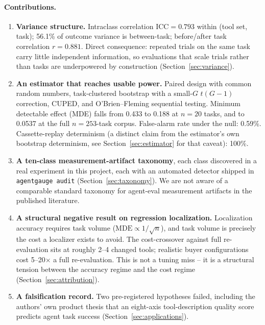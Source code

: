 \documentclass[11pt]{article}
\begin{document}
\paragraph{Contributions.}
\begin{enumerate}
\item \textbf{Variance structure.} Intraclass correlation $\mathrm{ICC}=0.793$ within (tool set,
  task); 56.1\% of outcome variance is between-task; before/after task correlation $r=0.881$.
  Direct consequence: repeated trials on the same task carry little independent information, so
  evaluations that scale trials rather than tasks are underpowered by construction
  (Section~\ref{sec:variance}).
\item \textbf{An estimator that reaches usable power.} Paired design with common random numbers,
  task-clustered bootstrap with a small-$G$ $t(G-1)$ correction, CUPED, and O'Brien--Fleming
  sequential testing. Minimum detectable effect (MDE) falls from 0.433 to 0.188 at $n=20$ tasks,
  and to 0.0537 at the full $n=253$-task corpus. False-alarm rate under the null: 0.59\%.
  Cassette-replay determinism (a distinct claim from the estimator's own bootstrap determinism,
  see Section~\ref{sec:estimator} for that caveat): 100\%.
\item \textbf{A ten-class measurement-artifact taxonomy}, each class discovered in a real
  experiment in this project, each with an automated detector shipped in \texttt{agentgauge audit}
  (Section~\ref{sec:taxonomy}). We are not aware of a comparable standard taxonomy for agent-eval
  measurement artifacts in the published literature.
\item \textbf{A structural negative result on regression localization.} Localization accuracy
  requires task volume ($\mathrm{MDE}\propto 1/\sqrt{n}$), and task volume is precisely the cost a
  localizer exists to avoid. The cost-crossover against full re-evaluation sits at roughly 2--4
  changed tools; realistic buyer configurations cost 5--20$\times$ a full re-evaluation.
  This is
  not a tuning miss -- it is a structural tension between the accuracy regime and the cost regime
  (Section~\ref{sec:attribution}).
\item \textbf{A falsification record.} Two pre-registered hypotheses failed, including the
  authors' own product thesis that an eight-axis tool-description quality score predicts agent
  task success (Section~\ref{sec:applications}).
\end{enumerate}
\end{document}
